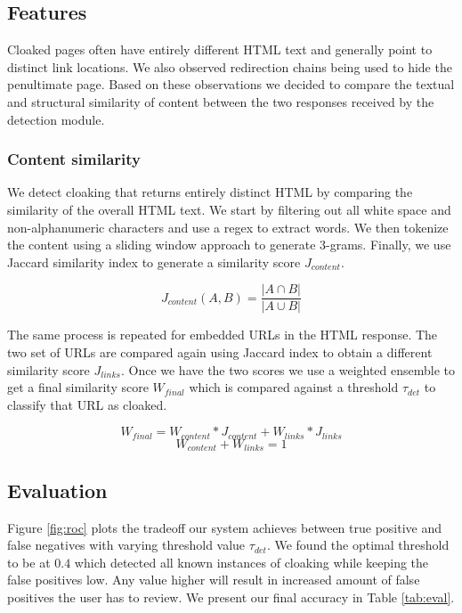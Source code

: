 \documentclass[letterpaper,twocolumn,10pt]{article}
\begin{document}
\subsection{Features}
Cloaked pages often have entirely different HTML text and generally point to distinct link locations. We also observed redirection chains being used to hide the penultimate page. Based on these observations we decided to compare the textual and structural similarity of content between the two responses received by the detection module.

\subsubsection{Content similarity}
We detect cloaking that returns entirely distinct HTML by comparing the similarity of the overall HTML text. We start by filtering out all white space and non-alphanumeric characters and use a regex to extract words. We then tokenize the content using a sliding window approach to generate 3-grams. Finally, we use Jaccard similarity index to generate a similarity score $J_{content}$.

\begin{equation}
J_{content}(A, B) = \frac{|A \cap B|}{|A \cup B|}
\end{equation}

The same process is repeated for embedded URLs in the HTML response. The two set of URLs are compared again using Jaccard index to obtain a different similarity score $J_{links}$. Once we have the two scores we use a weighted ensemble to get a final similarity score $W_{final}$ which is compared against a threshold $\tau_{det}$ to classify that URL as cloaked.


\begin{equation}
W_{final} =  W_{content} * J_{content} + W_{links} * J_{links}
\end{equation}
\begin{equation}
W_{content} + W_{links}  =   1
\end{equation}

\subsection{Evaluation}
Figure \ref{fig:roc} plots the tradeoff our system achieves between true positive and false negatives with varying threshold value $\tau_{det}$. We found the optimal threshold to be at $0.4$ which detected all known instances of cloaking while keeping the false positives low. Any value higher will result in increased amount of false positives the user has to review. We present our final accuracy in Table \ref{tab:eval}.
\end{document}
